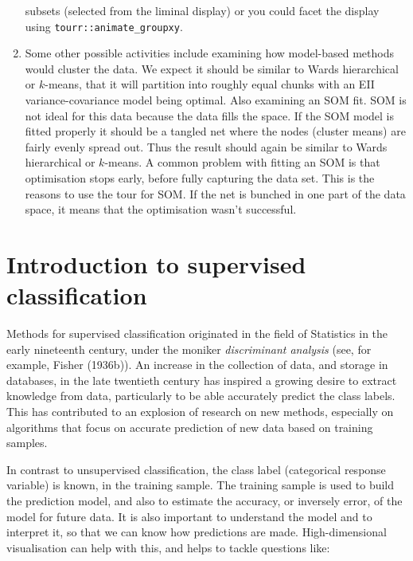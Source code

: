 \documentclass[
  letterpaper,
]{krantz}
\begin{document}
\begin{enumerate}
  subsets (selected from the liminal display) or you could facet the
  display using \texttt{tourr::animate\_groupxy}.
\item
  Some other possible activities include examining how model-based
  methods would cluster the data. We expect it should be similar to
  Wards hierarchical or \(k\)-means, that it will partition into roughly
  equal chunks with an EII variance-covariance model being optimal. Also
  examining an SOM fit. SOM is not ideal for this data because the data
  fills the space. If the SOM model is fitted properly it should be a
  tangled net where the nodes (cluster means) are fairly evenly spread
  out. Thus the result should again be similar to Wards hierarchical or
  \(k\)-means. A common problem with fitting an SOM is that optimisation
  stops early, before fully capturing the data set. This is the reasons
  to use the tour for SOM. If the net is bunched in one part of the data
  space, it means that the optimisation wasn't successful.
\end{enumerate}


\chapter{Introduction to supervised
classification}\label{introduction-to-supervised-classification}

Methods for supervised classification originated in the field of
Statistics in the early nineteenth century, under the moniker
\emph{discriminant analysis} (see, for example, Fisher (1936b)). An
increase in the collection of data, and storage in databases, in the
late twentieth century has inspired a growing desire to extract
knowledge from data, particularly to be able accurately predict the
class labels. This has contributed to an explosion of research on new
methods, especially on algorithms that focus on accurate prediction of
new data based on training samples.


In contrast to unsupervised classification, the class label (categorical
response variable) is known, in the training sample. The training sample
is used to build the prediction model, and also to estimate the
accuracy, or inversely error, of the model for future data. It is also
important to understand the model and to interpret it, so that we can
know how predictions are made. High-dimensional visualisation can help
with this, and helps to tackle questions like:
\end{document}
